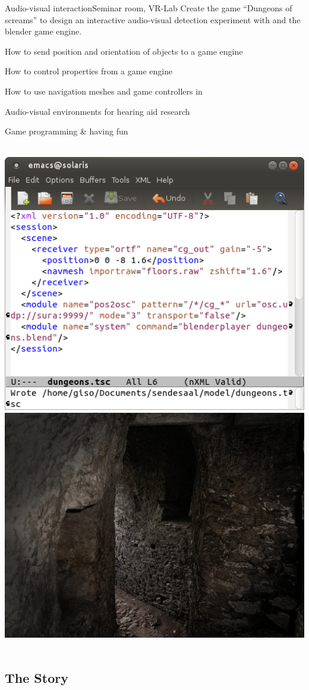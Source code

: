 \documentclass[11pt,a4paper,twoside]{article}
\begin{document}
\setcounter{tutorial}{4}
\begin{tutorial}{Audio-visual interaction}{Seminar room, VR-Lab}
  Create the game ``Dungeons of screams'' to design an interactive
  audio-visual detection experiment with \tascar{} and the blender game engine.

\begin{learnitems}
\item How to send position and orientation of objects to a game engine
\item How to control \tascar{} properties from a game engine
\item How to use navigation meshes and game controllers in \tascar{}
\end{learnitems}

\begin{appitems}
\item Audio-visual environments for hearing aid research
\item Game programming \& having fun
\end{appitems}

~\includegraphics[height=0.36\columnwidth]{t5_dungeonstsc.png}\hfill\includegraphics[height=0.36\columnwidth]{dungeons.jpg}~

\end{tutorial}

\ifshowtutorial

\newpage

\subsection*{The Story}
\end{document}
